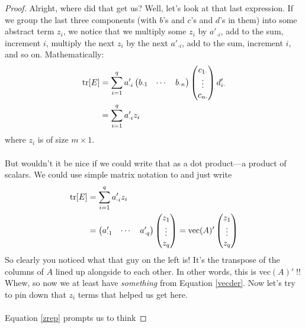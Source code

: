 \documentclass[a4paper,12pt]{scrartcl}
\begin{document}
\begin{proof}
\newpage
Alright, where did that get us? Well, let's look at 
that last expression. If we group the last 
three components (with $b$'s and $c$'s and
$d$'s in them) into some abstract term $z_i$, 
we notice that we multiply some $z_i$ by $a'_{\cdot i}$,
add to the sum, increment $i$, multiply the next $z_i$ by 
the next $a'_{\cdot i}$, add to the sum, increment $i$, and so 
on. Mathematically:
\begin{align}
    \text{tr}[E] 
    &= \sum^q_{i=1} a'_{\cdot i} 
	\begin{pmatrix} b_{\cdot 1} & \cdots & b_{\cdot n}
	\end{pmatrix}
	\begin{pmatrix} c_{1\cdot} \\ \vdots \\ c_{n \cdot}
	\end{pmatrix} 
	d'_{i \cdot} \notag \\
    &= \sum^q_{i=1} a'_{\cdot i}  z_i \label{goback}
\end{align}
where $z_i$ is of size $m\times 1$.
\\
\\
But wouldn't it be nice if we could write that as 
a dot product---a product of scalars.  
We could use simple matrix notation to 
and just write
\begin{align}
    \text{tr}[E] 
	&= \sum^q_{i=1} a'_{\cdot i}  z_i \notag \\
	&= \begin{pmatrix} a'_{\cdot 1}  
	    & \cdots & a'_{\cdot q} \end{pmatrix}
	    \begin{pmatrix} z_{1}  
	    \\ \vdots \\ z_{q} \end{pmatrix}
	= \text{vec} (A)'
	    \begin{pmatrix} z_{1}  
	    \\ \vdots \\ z_{q} \end{pmatrix}
	    \label{zrep}
\end{align}
So clearly you noticed what that guy on the left is! It's 
the transpose of the columns of $A$ lined up
alongside to each other.  In other words, this is
vec$(A)'\;$!! 
Whew, so now we at least have \emph{something}
from Equation \ref{vecder}.
Now let's try to pin down that $z_i$ terms that
helped us get here.
\\
\\
Equation \ref{zrep} prompts us to think

\end{proof}
\end{document}
